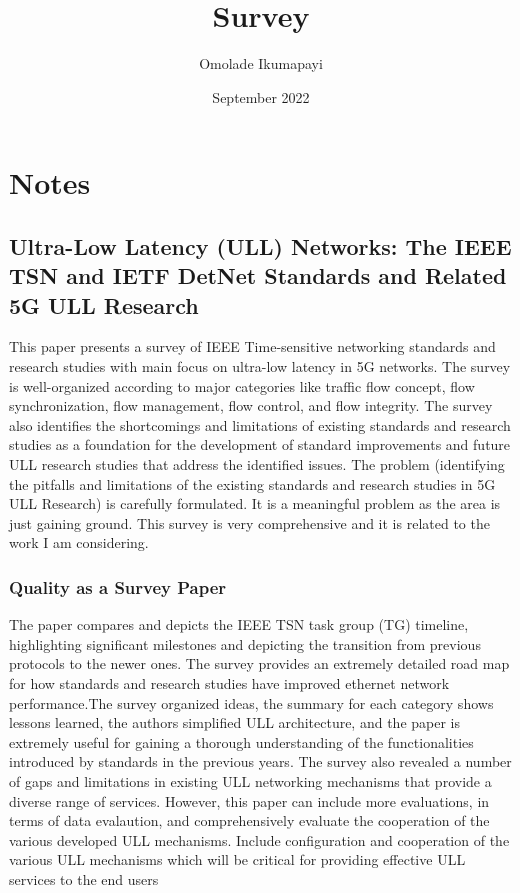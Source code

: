 \documentclass{article}
\title{Survey}
\author{Omolade Ikumapayi}
\date{September 2022}
\begin{document}
\maketitle

\section{Notes}
\subsection{Ultra-Low Latency (ULL) Networks: The IEEE
TSN and IETF DetNet Standards and Related
5G ULL Research}
This paper  \cite{nasrallah2018ultra} presents a survey of IEEE Time-sensitive networking standards and research studies with main focus on ultra-low latency in 5G networks. The survey is well-organized according to major categories like traffic flow concept, flow synchronization, flow management, flow control, and flow integrity. The survey also identifies the shortcomings and limitations of existing standards and research studies as a foundation for the development of standard improvements and future ULL research studies that address the identified issues.
The problem (identifying the pitfalls and limitations of
the existing standards and research studies in 5G ULL Research) is carefully formulated. It is a meaningful problem as the area is just gaining ground. This survey is very comprehensive and it is related to the work I am considering.

\subsubsection{Quality as a Survey Paper}
The paper compares and depicts the IEEE TSN task group (TG) timeline, highlighting significant milestones and depicting the transition from previous protocols to the newer ones.
The survey provides an extremely detailed road map for how standards and research studies have improved ethernet network performance.The survey organized ideas, the summary for each category shows lessons learned, the authors simplified ULL architecture, and the paper is extremely useful for gaining a thorough understanding of the functionalities introduced by standards in the previous years. The survey also revealed a number of gaps and limitations in existing ULL networking mechanisms that provide a diverse range of services. However, this paper can include more evaluations, in terms of data evalaution, and comprehensively evaluate the cooperation of the various developed ULL mechanisms. Include
configuration and cooperation of the various ULL mechanisms
which will be critical for providing effective ULL services to
the end users
\end{document}
